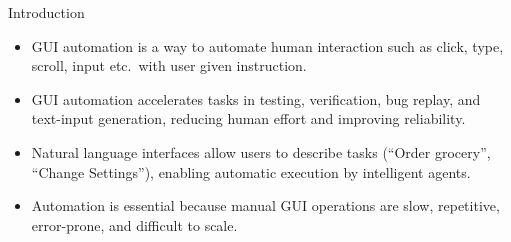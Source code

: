 \begin{frame}{Introduction}
  \begin{itemize}
    \item GUI automation is a way to automate human interaction such as click, type, scroll, input etc.\ with user given instruction.
    \item GUI automation accelerates tasks in testing, verification, bug replay, and text-input generation, reducing human effort and improving reliability.
    \item Natural language interfaces allow users to describe tasks (``Order grocery'', ``Change Settings''), enabling automatic execution by intelligent agents.
    \item Automation is essential because manual GUI operations are slow, repetitive, error-prone, and difficult to scale.
  \end{itemize}
\end{frame}
